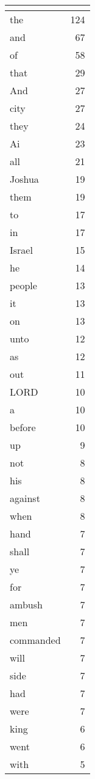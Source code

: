 \begin{center}
\begin{longtable}{l|r}
\hline \multicolumn{2}{c}{{ }} \\ \hline
\endfoot 
the & 124\\ \hline 
and & 67\\ \hline 
of & 58\\ \hline 
that & 29\\ \hline 
And & 27\\ \hline 
city & 27\\ \hline 
they & 24\\ \hline 
Ai & 23\\ \hline 
all & 21\\ \hline 
Joshua & 19\\ \hline 
them & 19\\ \hline 
to & 17\\ \hline 
in & 17\\ \hline 
Israel & 15\\ \hline 
he & 14\\ \hline 
people & 13\\ \hline 
it & 13\\ \hline 
on & 13\\ \hline 
unto & 12\\ \hline 
as & 12\\ \hline 
out & 11\\ \hline 
LORD & 10\\ \hline 
a & 10\\ \hline 
before & 10\\ \hline 
up & 9\\ \hline 
not & 8\\ \hline 
his & 8\\ \hline 
against & 8\\ \hline 
when & 8\\ \hline 
hand & 7\\ \hline 
shall & 7\\ \hline 
ye & 7\\ \hline 
for & 7\\ \hline 
ambush & 7\\ \hline 
men & 7\\ \hline 
commanded & 7\\ \hline 
will & 7\\ \hline 
side & 7\\ \hline 
had & 7\\ \hline 
were & 7\\ \hline 
king & 6\\ \hline 
went & 6\\ \hline 
with & 5\\ \hline 

\end{longtable}
\end{center}
